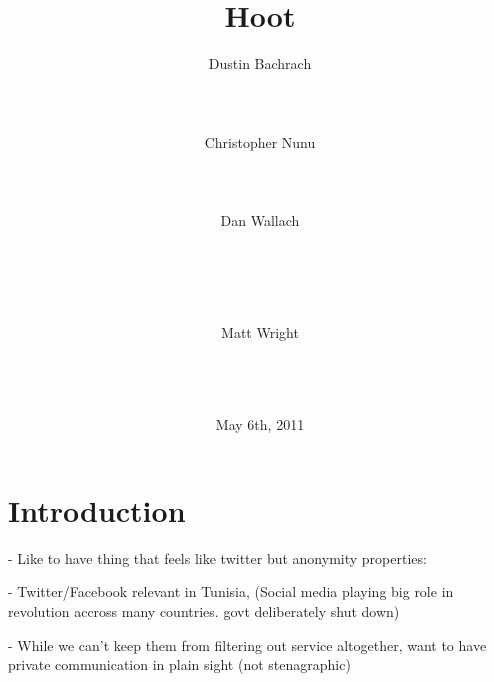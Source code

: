 \documentclass{acm_proc_article-sp}
\begin{document}

\author{
\alignauthor
	Dustin Bachrach\\
	\\
	\\
	\\
\alignauthor
 	Christopher Nunu\\
	\\
	\\
	\\
\alignauthor
	Dan Wallach\\
	\\
	\\
	\\
	\\
\and
\alignauthor
	Matt Wright\\
	\\
	\\
	\\
}

\title{Hoot}
\date{May 6th, 2011}

\maketitle

\begin{abstract}

\end{abstract}

\section{Introduction}

- Like to have thing that feels like twitter but anonymity properties:

- Twitter/Facebook relevant in Tunisia, (Social media playing big role in revolution accross many countries. govt deliberately shut down)

- While we can't keep them from filtering out service altogether, want to have private communication in plain sight (not stenagraphic)
\end{document}
